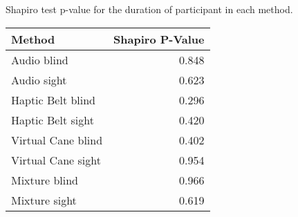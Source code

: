 
\centering
\caption{Shapiro test p-value for the duration of participant in each method.}
\label{tab:shapiro_duration}
\begin{tabular}{lr}
\toprule
            Method &  Shapiro P-Value \\
\midrule
       Audio blind &            0.848 \\
       Audio sight &            0.623 \\
 Haptic Belt blind &            0.296 \\
 Haptic Belt sight &            0.420 \\
Virtual Cane blind &            0.402 \\
Virtual Cane sight &            0.954 \\
     Mixture blind &            0.966 \\
     Mixture sight &            0.619 \\
\bottomrule
\end{tabular}
